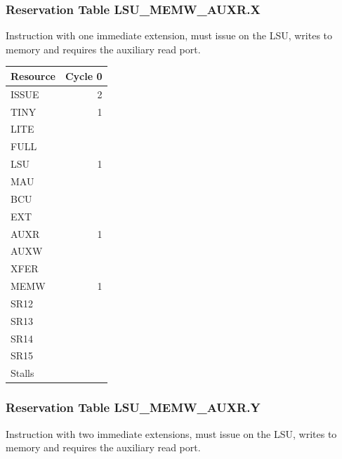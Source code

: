 \subsubsection{Reservation Table LSU\_MEMW\_AUXR.X} \label{sec:reservation-LSU-MEMW-AUXR.X}

Instruction with one immediate extension, must issue on the LSU, writes to memory and requires the auxiliary read port.
\medskip

\begin{tabular}{|l|r|} \hline
Resource	& Cycle 0 \\ \hline
\textsf{ISSUE}	& 2	\\
\textsf{TINY}	& 1	\\
\textsf{LITE}	& 	\\
\textsf{FULL}	& 	\\
\textsf{LSU}	& 1	\\
\textsf{MAU}	& 	\\
\textsf{BCU}	& 	\\
\textsf{EXT}	& 	\\
\textsf{AUXR}	& 1	\\
\textsf{AUXW}	& 	\\
\textsf{XFER}	& 	\\
\textsf{MEMW}	& 1	\\
\textsf{SR12}	& 	\\
\textsf{SR13}	& 	\\
\textsf{SR14}	& 	\\
\textsf{SR15}	& 	\\
\hline Stalls	& 	\\
\hline \end{tabular}

\subsubsection{Reservation Table LSU\_MEMW\_AUXR.Y} \label{sec:reservation-LSU-MEMW-AUXR.Y}

Instruction with two immediate extensions, must issue on the LSU, writes to memory and requires the auxiliary read port.
\medskip

